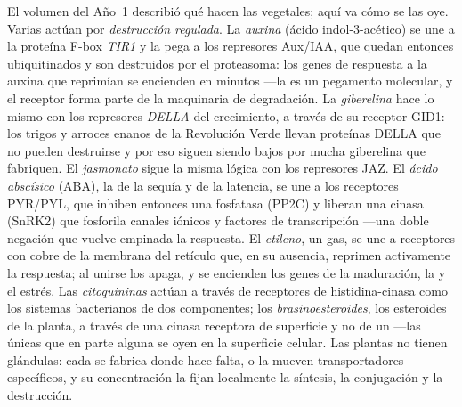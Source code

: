 \begin{definition}\label{def:b3:plant-molecular-physiology:hormones}
El volumen del Año~1 describió qué hacen las  vegetales; aquí
va cómo se las oye. Varias actúan por \emph{destrucción regulada}. La
\emph{auxina} (ácido indol-3-acético) se une a la proteína F-box
\emph{TIR1} y la pega a los represores Aux/IAA, que quedan entonces
ubiquitinados y son destruidos por el proteasoma: los genes de
respuesta a la auxina que reprimían se encienden en minutos ---la
 es un pegamento molecular, y el receptor forma parte de la
maquinaria de degradación. La \emph{giberelina} hace lo mismo con los
represores \emph{DELLA} del crecimiento, a través de su receptor GID1:
los trigos y arroces enanos de la Revolución Verde llevan proteínas
DELLA que no pueden destruirse y por eso siguen siendo bajos por mucha
giberelina que fabriquen. El \emph{jasmonato} sigue la misma lógica con
los represores JAZ. El \emph{ácido abscísico} (ABA), la  de la
sequía y de la latencia, se une a los receptores PYR/PYL, que inhiben
entonces una fosfatasa (PP2C) y liberan una cinasa (SnRK2) que fosforila
canales iónicos y factores de transcripción ---una doble negación que
vuelve empinada la respuesta. El \emph{etileno}, un gas, se une a
receptores con cobre de la membrana del retículo que, en su ausencia,
reprimen activamente la respuesta; al unirse los apaga, y se encienden
los genes de la maduración, la  y el estrés. Las
\emph{citoquininas} actúan a través de receptores de histidina-cinasa
como los sistemas bacterianos de dos componentes; los
\emph{brasinoesteroides}, los esteroides de la planta, a través de una
cinasa receptora de superficie y no de un  ---las
únicas  que en parte alguna se oyen en la
superficie celular. Las plantas no tienen glándulas: cada  se
fabrica donde hace falta, o la mueven transportadores específicos, y su
concentración la fijan localmente la síntesis, la conjugación y la
destrucción.
\end{definition}

